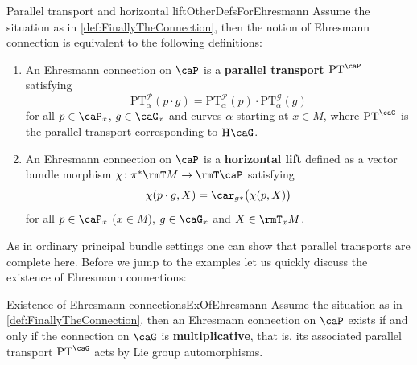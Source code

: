 \documentclass[reqno,a4paper,oneside]{amsart}
\theoremstyle{plain}
\theoremstyle{remark}
\theoremstyle{definition}
\begin{document}
\begin{corollaries}{Parallel transport and horizontal lift}{OtherDefsForEhresmann}
Assume the situation as in \ref{def:FinallyTheConnection}, then the notion of Ehresmann connection is equivalent to the following definitions:
\begin{enumerate}
	\item An Ehresmann connection on $\caP$ is a \textbf{parallel transport ${\rm PT}^\caP$} satisfying
	\begin{equation*}
		\mathrm{PT}_\alpha^{\mathcal{P}}(p \cdot g)
		=
		\mathrm{PT}_\alpha^{\mathcal{P}}(p) \cdot \mathrm{PT}_\alpha^{\mathcal{G}}(g)
	\end{equation*}
	for all $p \in \caP_x$, $g \in \caG_x$ and curves $\alpha$ starting at $x \in M$, where ${\rm PT}^\caG$ is the parallel transport corresponding to $\rm H \caG$.
	\item An Ehresmann connection on $\caP$ is a \textbf{horizontal lift} defined as a vector bundle morphism $\chi\colon \pi^*\rmT M \to \rmT \caP$ satisfying
	\begin{equation*}
	\chi(p\cdot g, X) = \car_{g*}\bigl( \chi(p, X) \bigr)
	\end{equation*}
	for all $p \in \caP_x$ ($x\in M$), $g \in \caG_x$ and $X \in \rmT_xM$.
\end{enumerate}
\end{corollaries}

As in ordinary principal bundle settings one can show that parallel transports are complete here. Before we jump to the examples let us quickly discuss the existence of Ehresmann connections: 

\begin{corollaries}{Existence of Ehresmann connections}{ExOfEhresmann}
Assume the situation as in \ref{def:FinallyTheConnection}, then an Ehresmann connection on $\caP$ exists if and only if the connection on $\caG$ is \textbf{multiplicative}, that is, its associated parallel transport ${\rm PT}^\caG$ acts by Lie group automorphisms.
\end{corollaries}
\end{document}
